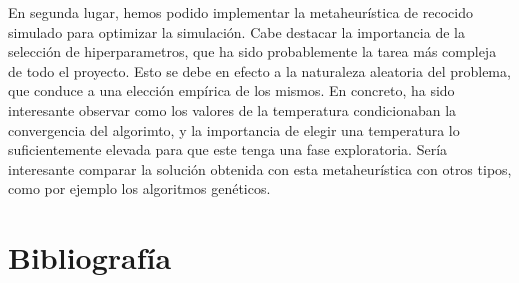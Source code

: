 \documentclass[a4paper,12pt]{article}
\begin{document}
	En segunda lugar, hemos podido implementar la metaheurística de recocido simulado para optimizar la 
	simulación. Cabe destacar la importancia de la selección de hiperparametros, que ha sido probablemente la tarea más compleja de todo el proyecto. Esto se debe en efecto a la naturaleza aleatoria del problema, 
	que conduce a una elección empírica de los mismos. En concreto, ha sido interesante observar como los valores de la temperatura condicionaban la convergencia del algorimto, y la importancia de elegir una temperatura lo suficientemente elevada para que este tenga una 
	fase exploratoria. Sería interesante comparar la solución obtenida con esta metaheurística con otros tipos, como por ejemplo los algoritmos genéticos.
	\newpage
	\section*{Bibliografía}
	
	
	
\end{document}

